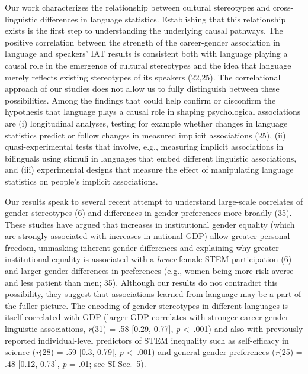\documentclass[9pt,twocolumn]{pnas-new}
\begin{document}
Our work characterizes the relationship between cultural stereotypes and cross-linguistic differences in language statistics. Establishing that this relationship exists is the first step to understanding the underlying causal pathways. The positive correlation between the strength of the career-gender association in language and speakers' IAT results is consistent both with language playing a causal role in the emergence of cultural stereotypes and the idea that language merely reflects existing stereotypes of its speakers (22,25). The correlational approach of our studies does not allow us to fully distinguish between these possibilities. Among the findings that could help confirm or disconfirm the hypothesis that language plays a causal role in shaping psychological associations are (i) longitudinal analyses, testing for example whether changes in language statistics predict or follow changes in measured implicit associations (25), (ii) quasi-experimental tests that involve, e.g., measuring implicit associations in bilinguals using stimuli in languages that embed different linguistic associations, and (iii) experimental designs that measure the effect of manipulating language statistics on people's implicit associations.

Our results speak to several recent attempt to understand large-scale correlates of gender stereotypes (6) and differences in gender preferences more broadly (35). These studies have argued that increases in institutional gender equality (which are strongly associated with increases in national GDP) allow greater personal freedom, unmasking inherent gender differences and explaining why greater institutional equality is associated with a \textit{lower} female STEM participation (6) and larger gender differences in preferences (e.g., women being more risk averse and less patient than men; 35). Although our results do not contradict this possibility, they suggest that associations learned from language may be a part of the fuller picture. The encoding of gender stereotypes in different languages is itself correlated with GDP (larger GDP correlates with stronger career-gender linguistic associations, \emph{r}(31) = .58 {[}0.29, 0.77{]}, \emph{p} \textless\ .001) and also with previously reported individual-level predictors of STEM inequality such as self-efficacy in science  (\emph{r}(28) = .59 {[}0.3, 0.79{]}, \emph{p} \textless\ .001) and general gender preferences (\emph{r}(25) = .48 {[}0.12, 0.73{]}, \emph{p} = .01; see SI Sec.\ 5). 
\end{document}
